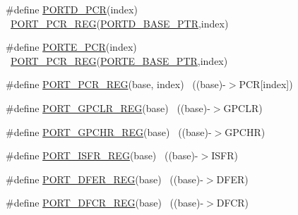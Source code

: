 \begin{DoxyCompactItemize}
\item 
\#define \hyperlink{group___p_o_r_t___register___accessor___macros_gac2a3e9731320fb291256347dfee6d6c5}{P\+O\+R\+T\+D\+\_\+\+P\+CR}(index)                                              ~\hyperlink{group___p_o_r_t___register___accessor___macros_gac6f8c9eab2e63700616f4d4fa4a6ef0e}{P\+O\+R\+T\+\_\+\+P\+C\+R\+\_\+\+R\+EG}(\hyperlink{group___p_o_r_t___peripheral_ga7f5a263751543810ebfdbde278383276}{P\+O\+R\+T\+D\+\_\+\+B\+A\+S\+E\+\_\+\+P\+TR},index)
\item 
\#define \hyperlink{group___p_o_r_t___register___accessor___macros_ga34d5c13bac091141ec60f381569ea24d}{P\+O\+R\+T\+E\+\_\+\+P\+CR}(index)                                              ~\hyperlink{group___p_o_r_t___register___accessor___macros_gac6f8c9eab2e63700616f4d4fa4a6ef0e}{P\+O\+R\+T\+\_\+\+P\+C\+R\+\_\+\+R\+EG}(\hyperlink{group___p_o_r_t___peripheral_gab166fe285bbb15b52de610f408fe25d3}{P\+O\+R\+T\+E\+\_\+\+B\+A\+S\+E\+\_\+\+P\+TR},index)
\item 
\#define \hyperlink{group___p_o_r_t___register___accessor___macros_gac6f8c9eab2e63700616f4d4fa4a6ef0e}{P\+O\+R\+T\+\_\+\+P\+C\+R\+\_\+\+R\+EG}(base,  index)                              ~((base)-\/$>$P\+CR\mbox{[}index\mbox{]})
\item 
\#define \hyperlink{group___p_o_r_t___register___accessor___macros_gabbf5476f842aa7b313fdd3fedad41ca1}{P\+O\+R\+T\+\_\+\+G\+P\+C\+L\+R\+\_\+\+R\+EG}(base)                                      ~((base)-\/$>$G\+P\+C\+LR)
\item 
\#define \hyperlink{group___p_o_r_t___register___accessor___macros_ga5436d30f4741eacd3c61c337b626ab55}{P\+O\+R\+T\+\_\+\+G\+P\+C\+H\+R\+\_\+\+R\+EG}(base)                                      ~((base)-\/$>$G\+P\+C\+HR)
\item 
\#define \hyperlink{group___p_o_r_t___register___accessor___macros_gace6266e51916939b6ebd7cdb38394c6f}{P\+O\+R\+T\+\_\+\+I\+S\+F\+R\+\_\+\+R\+EG}(base)                                        ~((base)-\/$>$I\+S\+FR)
\item 
\#define \hyperlink{group___p_o_r_t___register___accessor___macros_gaf4400f8add6cb007e24074363387e938}{P\+O\+R\+T\+\_\+\+D\+F\+E\+R\+\_\+\+R\+EG}(base)                                        ~((base)-\/$>$D\+F\+ER)
\item 
\#define \hyperlink{group___p_o_r_t___register___accessor___macros_ga317b840ce4f1cdc8a67975e5ddc85b05}{P\+O\+R\+T\+\_\+\+D\+F\+C\+R\+\_\+\+R\+EG}(base)                                        ~((base)-\/$>$D\+F\+CR)
\item 

\end{DoxyCompactItemize}

